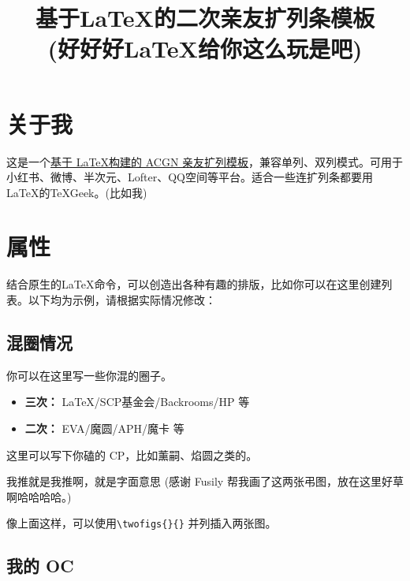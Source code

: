 \documentclass[10pt, light]{resubar}
\title{基于\LaTeX 的二次亲友扩列条模板 \\\small (好好好\LaTeX{}给你这么玩是吧)}
\begin{document}
\maketitle

\section{关于我}

这是一个\uline{基于 \LaTeX 构建的 ACGN 亲友扩列模板}，兼容单列、双列模式。可用于小红书、微博、半次元、Lofter、QQ空间等平台。适合一些连扩列条都要用\LaTeX 的\TeX Geek。(比如我)


\section{属性}

结合原生的\LaTeX 命令，可以创造出各种有趣的排版，比如你可以在这里创建列表。以下均为示例，请根据实际情况修改：

\subsection{混圈情况}

\begin{preference}
  你可以在这里写一些你混的圈子。
  \begin{itemize}
    \item \textbf{三次：} \LaTeX{}/SCP基金会/Backrooms/HP 等
    \item \textbf{二次：} EVA/魔圆/APH/魔卡 等
  \end{itemize}
\end{preference}

\begin{cp}
  这里可以写下你磕的 CP，比如薰嗣、焰圆之类的。
\end{cp}

\begin{oshi}
  我推就是我推啊，就是字面意思 (感谢 Fusily 帮我画了这两张弔图，放在这里好草啊哈哈哈哈。)
\end{oshi}

像上面这样，可以使用\texttt{\textbackslash twofigs\{\}\{\}} 并列插入两张图。

\subsection{我的 OC}
\end{document}
